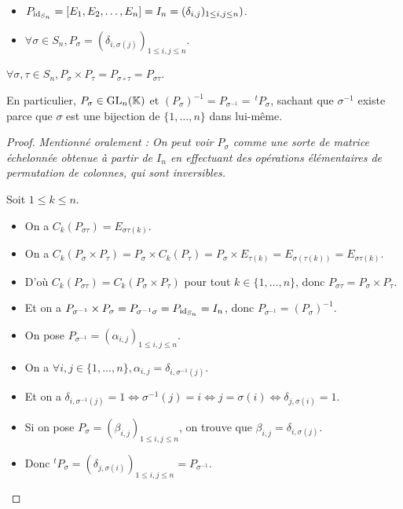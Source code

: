 \documentclass[12pt, a4paper]{report}
\begin{document}
\begin{remark}
    \begin{itemize}
        \item $P_{\mathrm{id}_{S_n}} = [E_1,E_2,\dots,E_n] = I_n = (\delta_{i,j})_{1 \le i,j \le n})$.
        \item $\forall \sigma \in S_n, P_\sigma = (\delta_{i,\sigma(j)})_{1 \le i,j \le n}$.
    \end{itemize}
\end{remark}

\begin{property}
    $\forall \sigma,\tau \in S_n, P_\sigma \times P_\tau = P_{\sigma \circ \tau} = P_{\sigma \tau}$.

    En particulier, $P_\sigma \in \mathrm{GL}_n(\mathbb{K})$ et $(P_\sigma)^{-1} = P_{\sigma^{-1}} = \,^tP_\sigma$, sachant que $\sigma^{-1}$ existe parce que $\sigma$ est une bijection de $\{1,\dots,n\}$ dans lui-même.
\end{property}

\begin{proof}
    \textit{Mentionné oralement : On peut voir $P_\sigma$ comme une sorte de matrice échelonnée obtenue à partir de $I_n$ en effectuant des opérations élémentaires de permutation de colonnes, qui sont inversibles.}

    Soit $1 \le k \le n$.

    \begin{itemize}
        \item On a $C_k(P_{\sigma \tau}) = E_{\sigma \tau(k)}$.
        \item On a $C_k(P_\sigma \times P_\tau) = P_\sigma \times C_k(P_\tau) = P_\sigma \times E_{\tau(k)} = E_{\sigma(\tau(k))} = E_{\sigma \tau(k)}$.
        \item D'où $C_k(P_{\sigma \tau}) = C_k(P_\sigma \times P_\tau)$ pour tout $k \in \{1,\dots,n\}$, donc $P_{\sigma \tau} = P_\sigma \times P_\tau$.
        \item Et on a $P_{\sigma^{-1}} \times P_\sigma = P_{\sigma^{-1} \sigma} = P_{\mathrm{id}_{S_n}} = I_n$, donc $P_{\sigma^{-1}} = (P_\sigma)^{-1}$.
        \item On pose $P_{\sigma^{-1}} = (\alpha_{i,j})_{1 \le i,j \le n}$.
        \item On a $\forall i,j \in \{1,\dots,n\}, \alpha_{i,j} = \delta_{i,\sigma^{-1}(j)}$.
        \item Et on a $\delta_{i,\sigma^{-1}(j)} = 1 \iff \sigma^{-1}(j) = i \iff j = \sigma(i) \iff \delta_{j,\sigma(i)} = 1$.
        \item Si on pose $P_\sigma = (\beta_{i,j})_{1 \le i,j \le n}$, on trouve que $\beta_{i,j} = \delta_{i,\sigma(j)}$.
        \item Donc $^tP_\sigma = (\delta_{j,\sigma(i)})_{1 \le i,j \le n} = P_{\sigma^{-1}}$.
    \end{itemize}
\end{proof}
\end{document}
